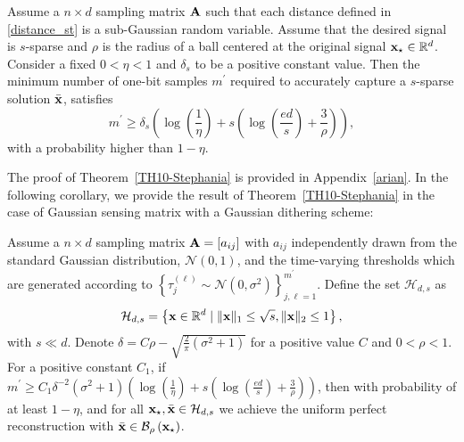\documentclass[12pt,draftcls,onecolumn]{IEEEtran}
\begin{document}
\begin{theorem}
\label{TH10-Stephania}
Assume a $n\times d$ sampling matrix $\mathbf{A}$ such that each distance defined in \eqref{distance_st} is a
sub-Gaussian random variable. Assume that the desired signal is $s$-sparse and $\rho$ is the radius of a ball centered at the original signal $\mathbf{x}_{\star}\in\mathbb{R}^{d}$. Consider a fixed $0<\eta< 1$ %
and $\delta_s$ %
to be a positive constant value.  
Then the minimum number of one-bit samples $m^{\prime}$ required to accurately capture a $s$-sparse solution $\bar{\mathbf{x}}$, satisfies
\begin{equation}
\label{goodarz_1}
m^{\prime}\geq\delta_s\left(\log\left(\frac{1}{\eta}\right)+s\left(\log\left(\frac{ed}{s}\right)+\frac{3}{\rho}\right)\right),
\end{equation}\normalsize
with a probability higher than $1-\eta$. 
\end{theorem}
The proof of Theorem~\ref{TH10-Stephania} is provided in Appendix~\ref{arian}. 
In the following corollary, we provide the result of Theorem~\ref{TH10-Stephania} in the case of Gaussian sensing matrix with a Gaussian dithering scheme:
\begin{corollary}
\label{kvm_35}
Assume a $n\times d$ sampling matrix $\mathbf{A}=[a_{ij}]$ with $a_{ij}$ independently drawn from the standard Gaussian distribution, $\mathcal{N}(0,1)$, and the time-varying thresholds which %
are generated according to $\left\{\tau^{(\ell)}_{j}\sim \mathcal{N}\left(0,\sigma^2\right)\right\}_{j,\ell=1}^{m^{\prime}}$. Define the set $\mathcal{H}_{d,s}$ as
\begin{equation}
\label{kvm_36}
\mathcal{H}_{d,s}=\left\{\mbx\in\mathbb{R}^{d}\mid\|\mbx\|_1\leq\sqrt{s},\|\mbx\|_2\leq 1\right\},
\end{equation}
with $s\ll d$. Denote $\delta=C\rho-\sqrt{\frac{2}{\pi}(\sigma^2+1)}$ for a positive value $C$ and $0<\rho<1$. For a positive constant $C_1$, if $m^{\prime}\geq C_1\delta^{-2}(\sigma^2+1)\left(\log\left(\frac{1}{\eta}\right)+s\left(\log\left(\frac{ed}{s}\right)+\frac{3}{\rho}\right)\right)$, then with probability of at least $1-\eta$, and for all $\mathbf{x}_{\star},\bar{\mathbf{x}}\in\mathcal{H}_{d,s}$ we achieve the uniform perfect reconstruction with $\bar{\mathbf{x}}\in\mathcal{B}_\rho\left(\mathbf{x}_{\star}\right)$.

\end{corollary}
\end{document}
